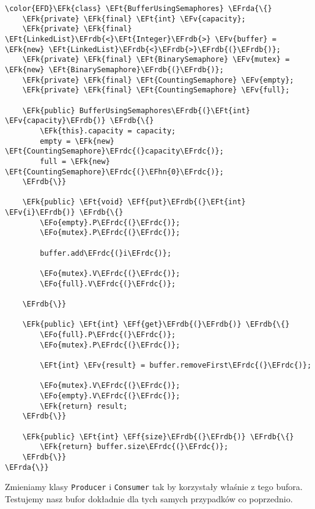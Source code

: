 \documentclass[11pt]{article}
\newcommand{\EFk}[1]{\textcolor{EFk}{#1}} %
\newcommand{\EFf}[1]{\textcolor{EFf}{#1}} %
\newcommand{\EFv}[1]{\textcolor{EFv}{#1}} %
\newcommand{\EFt}[1]{\textcolor{EFt}{#1}} %
\newcommand{\EFo}[1]{\textcolor{EFo}{#1}} %
\newcommand{\EFhn}[1]{\textcolor{EFhn}{#1}} %
\newcommand{\EFrda}[1]{#1} %
\newcommand{\EFrdb}[1]{\textcolor{EFrdb}{#1}} %
\newcommand{\EFrdc}[1]{\textcolor{EFrdc}{#1}} %
\begin{document}
\begin{Code}
\begin{Verbatim}
\color{EFD}\EFk{class} \EFt{BufferUsingSemaphores} \EFrda{\{}
    \EFk{private} \EFk{final} \EFt{int} \EFv{capacity};
    \EFk{private} \EFk{final} \EFt{LinkedList}\EFrdb{<}\EFt{Integer}\EFrdb{>} \EFv{buffer} = \EFk{new} \EFt{LinkedList}\EFrdb{<}\EFrdb{>}\EFrdb{(}\EFrdb{)};
    \EFk{private} \EFk{final} \EFt{BinarySemaphore} \EFv{mutex} = \EFk{new} \EFt{BinarySemaphore}\EFrdb{(}\EFrdb{)};
    \EFk{private} \EFk{final} \EFt{CountingSemaphore} \EFv{empty};
    \EFk{private} \EFk{final} \EFt{CountingSemaphore} \EFv{full};

    \EFk{public} BufferUsingSemaphores\EFrdb{(}\EFt{int} \EFv{capacity}\EFrdb{)} \EFrdb{\{}
        \EFk{this}.capacity = capacity;
        empty = \EFk{new} \EFt{CountingSemaphore}\EFrdc{(}capacity\EFrdc{)};
        full = \EFk{new} \EFt{CountingSemaphore}\EFrdc{(}\EFhn{0}\EFrdc{)};
    \EFrdb{\}}

    \EFk{public} \EFt{void} \EFf{put}\EFrdb{(}\EFt{int} \EFv{i}\EFrdb{)} \EFrdb{\{}
        \EFo{empty}.P\EFrdc{(}\EFrdc{)};
        \EFo{mutex}.P\EFrdc{(}\EFrdc{)};

        buffer.add\EFrdc{(}i\EFrdc{)};

        \EFo{mutex}.V\EFrdc{(}\EFrdc{)};
        \EFo{full}.V\EFrdc{(}\EFrdc{)};

    \EFrdb{\}}

    \EFk{public} \EFt{int} \EFf{get}\EFrdb{(}\EFrdb{)} \EFrdb{\{}
        \EFo{full}.P\EFrdc{(}\EFrdc{)};
        \EFo{mutex}.P\EFrdc{(}\EFrdc{)};

        \EFt{int} \EFv{result} = buffer.removeFirst\EFrdc{(}\EFrdc{)};

        \EFo{mutex}.V\EFrdc{(}\EFrdc{)};
        \EFo{empty}.V\EFrdc{(}\EFrdc{)};
        \EFk{return} result;
    \EFrdb{\}}

    \EFk{public} \EFt{int} \EFf{size}\EFrdb{(}\EFrdb{)} \EFrdb{\{}
        \EFk{return} buffer.size\EFrdc{(}\EFrdc{)};
    \EFrdb{\}}
\EFrda{\}}
\end{Verbatim}
\end{Code}

Zmieniamy klasy \texttt{Producer} i \texttt{Consumer} tak by korzystały właśnie z tego bufora.
Testujemy nasz bufor dokładnie dla tych samych przypadków co poprzednio.
\end{document}
